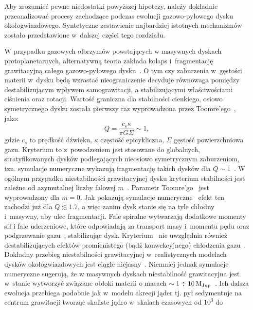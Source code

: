\par Aby zrozumieć pewne niedostatki powyższej hipotezy, należy
dokładnie przeanalizować procesy zachodzące podczas ewolucji gazowo-pyłowego
dysku okołogwiazdowego. Syntetyczne zestawienie najbardziej istotnych
mechanizmów zostało przedstawione w~dalszej części tego rozdziału.

\par W przypadku gazowych olbrzymów powstających w masywnych dyskach
protoplanetarnych, alternatywną teoria zakłada kolaps i~fragmentację
grawitacyjną całego gazowo-pyłowego dysku~\cite{Boss97}. O tym czy zaburzenia
w~gęstości materii w~dysku będą wzrastać nieograniczenie decyduje równowaga
pomiędzy destabilizującym wpływem samograwitacji, a stabilizującymi
właściwościami ciśnienia oraz rotacji.  Wartość graniczna dla stabilności
cienkiego, osiowo symetrycznego dysku została pierwszy raz wyprowadzona przez
Toomre'ego~\cite{T64}, jako:
%
\begin{equation}
   Q = \frac{c_s\kappa}{\pi G \Sigma}\sim 1,
   \label{eq:toomre}
\end{equation}
%
gdzie $c_s$ to prędkość dźwięku, $\kappa$ częstość epicykliczna, $\Sigma$
gęstość powierzchniowa gazu. Kryterium to z~powodzeniem jest stosowane do
globalnych, stratyfikowanych dysków podlegających nieosiowo symetrycznym
zaburzeniom, tzn. symulacje numeryczne wykazują fragmentację takich dysków dla
$Q\sim 1$~\cite{NBAA98}. W ogólnym przypadku niestabilności grawitacyjnej dysku
kryterium stabilności jest zależne od azymutalnej liczby falowej
$m$~\cite{BT87}. Parametr Toomre'go~ jest wyprowadzony dla
$m=0$. Jak pokazują symulacje numeryczne~\cite{Duris07} efekt ten zachodzi już
dla $Q\lesssim 1.7$, a więc zanim dysk stanie się na tyle chłodny i~masywny, aby
ulec fragmentacji. Fale spiralne wytwarzają dodatkowe momenty sił i fale
uderzeniowe, które odpowiadają za transport masy i~momentu pędu oraz
podgrzewanie gazu~\cite{YC85}, stabilizując dysk. Kryterium~ nie
uwzględnia również destabilizujących efektów promienistego (bądź konwekcyjnego)
chłodzenia gazu~\cite{BMD06}. Dokładny przebieg niestabilności grawitacyjnej
w~realistycznych modelach dysków okołogwiazdowych jest ciągle
niejasny~\cite{MB11, LC11}. Niemniej jednak symulacje numeryczne sugerują, że w
masywnych dyskach niestabilność grawitacyjna jest w~stanie wytworzyć związane
obłoki materii o masach $\sim 1\div 10\hbox{$\mathrm{\thinspace M_{\textrm{Jup}}}$}$~\cite{BHM10, FR11}. Ich dalsza
ewolucja przebiega podobnie jak w~modelu akrecji jąder tj. pył sedymentuje na
centrum grawitacji tworząc skaliste jądro w~skalach czasowych od $10^3$ do
